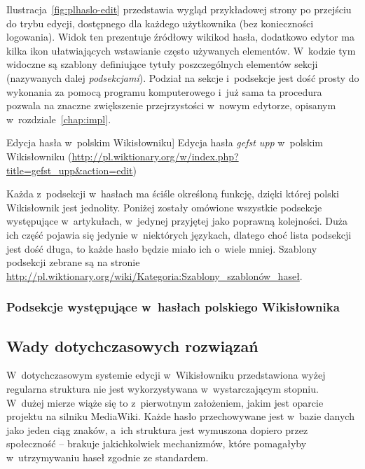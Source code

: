 Ilustracja~\ref{fig:plhaslo-edit} przedstawia wygląd przykładowej strony po przejściu do trybu edycji, dostępnego dla każdego użytkownika (bez konieczności logowania). Widok ten prezentuje źródłowy wikikod hasła, dodatkowo edytor ma kilka ikon ułatwiających wstawianie często używanych elementów. W~kodzie tym widoczne są szablony definiujące tytuły poszczególnych elementów sekcji (nazywanych dalej \emph{podsekcjami}). Podział na sekcje i~podsekcje jest dość prosty do wykonania za pomocą programu komputerowego i~już sama ta procedura pozwala na znaczne zwiększenie przejrzystości w~nowym edytorze, opisanym w~rozdziale~\ref{chap:impl}.

\begin{illustration}
	\caption
		[Edycja hasła w~polskim Wikisłowniku]
		{Edycja hasła \emph{gefst upp} w~polskim Wikisłowniku (\protect\url{http://pl.wiktionary.org/w/index.php?title=gefst_upp&action=edit})}
	\label{fig:plhaslo-edit}
\end{illustration}

Każda z~podsekcji w~hasłach ma ściśle określoną funkcję, dzięki której polski Wikisłownik jest jednolity. Poniżej zostały omówione wszystkie podsekcje występujące w~artykułach, w~jedynej przyjętej jako poprawną kolejności. Duża ich część pojawia się jedynie w~niektórych językach, dlatego choć lista podsekcji jest dość długa, to każde hasło będzie miało ich o~wiele mniej. Szablony podsekcji zebrane są na stronie \url{http://pl.wiktionary.org/wiki/Kategoria:Szablony_szablonów_haseł}.

\subsubsection{Podsekcje występujące w~hasłach polskiego Wikisłownika}



\subsection{Wady dotychczasowych rozwiązań}
\label{wikt:drawbacks}
W~dotychczasowym systemie edycji w~Wikisłowniku przedstawiona wyżej regularna struktura nie jest wykorzystywana w~wystarczającym stopniu. W~dużej mierze wiąże się to z~pierwotnym założeniem, jakim jest oparcie projektu na silniku MediaWiki. Każde hasło przechowywane jest w~bazie danych jako jeden ciąg znaków, a~ich struktura jest wymuszona dopiero przez społeczność -- brakuje jakichkolwiek mechanizmów, które pomagałyby w~utrzymywaniu haseł zgodnie ze standardem.

